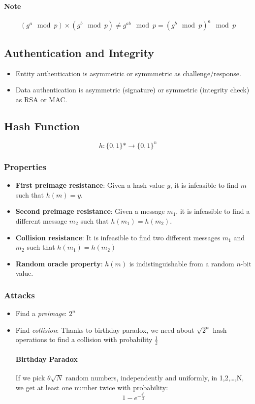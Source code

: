 \paragraph{Note}$$(g^a\mod p)\times (g^b \mod p) \ne g^{ab} \mod p = (g^b \mod p)^a \mod p$$


\subsection{Authentication and Integrity}
\begin{itemize}
    \item Entity authentication is asymmetric or symmmetric as
        challenge/response.
    \item Data authentication is
        asymmetric (signature) or symmetric (integrity check) as RSA or
        MAC.
\end{itemize}

\subsection{Hash Function}

$$h:\{0,1\}*\rightarrow\{0,1\}^n$$

\subsubsection{Properties}

\begin{itemize}
    \item \textbf{First preimage resistance}: Given a hash value $y$, it is infeasible to
        find $m$ such that $h(m) = y$.
    \item \textbf{Second preimage resistance}: Given a message $m_1$, it is infeasible
        to find a different message $m_2$ such that $h(m_1)=h(m_2)$.
    \item \textbf{Collision resistance}: It is infeasible to find two different messages
        $m_1$ and $m_2$ such that $h(m_1)=h(m_2)$
    \item \textbf{Random oracle property}: $h(m)$ is indistinguishable from a
        random $n$-bit value.
\end{itemize}

\subsubsection{Attacks}
\begin{itemize}
    \item Find a \textit{preimage}: $2^n$
    \item Find \textit{collision}: Thanks to birthday paradox,
        we need about $\sqrt{2^n}$ hash operations to find a
        collision with probability $\frac{1}{2}$

        \paragraph{Birthday Paradox} If we pick $\theta\sqrt{N}$ random numbers,
        independently and uniformly, in {1,2,\ldots,N}, we get at least one number twice
        with probability:
        $$1-e^{-\frac{\theta^2}{2}}$$
\end{itemize}

